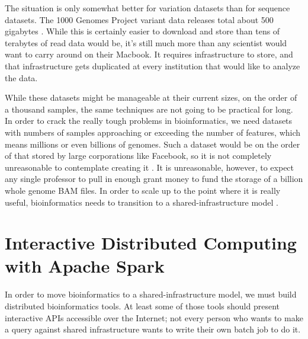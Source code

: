 \documentclass[11pt,proposal]{ucthesis}
\begin{document}
The situation is only somewhat better for variation datasets than for sequence datasets. The 1000 Genomes Project variant data releases total about 500 gigabytes \cite{10002013release}. While this is certainly easier to download and store than tens of terabytes of read data would be, it's still much more than any scientist would want to carry around on their Macbook. It requires infrastructure to store, and that infrastructure gets duplicated at every institution that would like to analyze the data.

While these datasets might be manageable at their current sizes, on the order of a thousand samples, the same techniques are not going to be practical for long. In order to crack the really tough problems in bioinformatics, we need datasets with numbers of samples approaching or exceeding the number of features, which means millions or even billions of genomes. Such a dataset would be on the order of that stored by large corporations like Facebook, so it is not completely unreasonable to contemplate creating it \cite{anthony2012how}. It is unreasonable, however, to expect any single professor to pull in enough grant money to fund the storage of a billion whole genome BAM files. In order to scale up to the point where it is really useful, bioinformatics needs to transition to a shared-infrastructure model \cite{stein2010case}.


    
    
    
        
        
        

\section{Interactive Distributed Computing with Apache Spark}

In order to move bioinformatics to a shared-infrastructure model, we must build distributed bioinformatics tools. At least some of those tools should present interactive APIs accessible over the Internet; not every person who wants to make a query against shared infrastructure wants to write their own batch job to do it.
\end{document}
